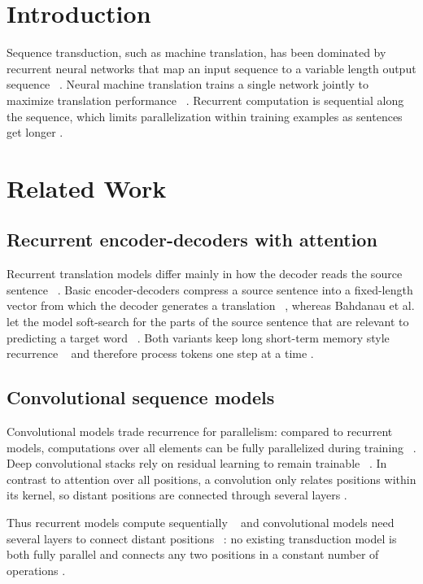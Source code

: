 \section{Introduction}

Sequence transduction, such as machine translation, has been dominated by recurrent neural networks that map an input sequence to a variable length output sequence ~\cite{gehring2017}. Neural machine translation trains a single network jointly to maximize translation performance ~\cite{bahdanau2015}. Recurrent computation is sequential along the sequence, which limits parallelization within training examples as sentences get longer .

\section{Related Work}

\subsection{Recurrent encoder-decoders with attention}

Recurrent translation models differ mainly in how the decoder reads the source sentence ~\cite{bahdanau2015,wu2016}. Basic encoder-decoders compress a source sentence into a fixed-length vector from which the decoder generates a translation ~\cite{bahdanau2015}, whereas Bahdanau et al. let the model soft-search for the parts of the source sentence that are relevant to predicting a target word ~\cite{bahdanau2015}. Both variants keep long short-term memory style recurrence ~\cite{hochreiter1997} and therefore process tokens one step at a time .

\subsection{Convolutional sequence models}

Convolutional models trade recurrence for parallelism: compared to recurrent models, computations over all elements can be fully parallelized during training ~\cite{gehring2017}. Deep convolutional stacks rely on residual learning to remain trainable ~\cite{he2016}. In contrast to attention over all positions, a convolution only relates positions within its kernel, so distant positions are connected through several layers .

Thus recurrent models compute sequentially ~\cite{gehring2017} and convolutional models need several layers to connect distant positions ~\cite{gehring2017}: no existing transduction model is both fully parallel and connects any two positions in a constant number of operations .

